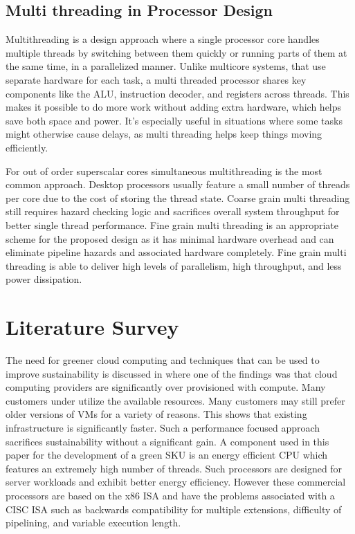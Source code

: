 \documentclass[conference]{IEEEtran}
\begin{document}
\subsection{Multi threading in Processor Design}

Multithreading is a design approach where a single processor core handles multiple threads by switching between them quickly or running parts of them at the same time, in a parallelized manner. Unlike multicore systems, that use separate hardware for each task, a multi threaded processor shares key components like the ALU, instruction decoder, and registers across threads. This makes it possible to do more work without adding extra hardware, which helps save both space and power. It’s especially useful in situations where some tasks might otherwise cause delays, as multi threading helps keep things moving efficiently.

For out of order superscalar cores simultaneous multithreading is the most common approach. Desktop processors usually feature a small number of threads per core due to the cost of storing the thread state. Coarse grain multi threading still requires hazard checking logic and sacrifices overall system throughput for better single thread performance. Fine grain multi threading is an appropriate scheme for the proposed design as it has minimal hardware overhead and can eliminate pipeline hazards and associated hardware completely. Fine grain multi threading is able to deliver high levels of parallelism, high throughput, and less power dissipation.

\section{Literature Survey}
\begin{flushleft}
The need for greener cloud computing and techniques that can be used to improve sustainability is discussed in \cite{GreenSKU} where one of the findings was that cloud computing providers are significantly over provisioned with compute. Many customers under utilize the available resources. Many customers may still prefer older versions of VMs for a variety of reasons. This shows that existing infrastructure is significantly faster. Such a performance focused approach sacrifices sustainability without a significant gain. A component used in this paper for the development of a green SKU is an energy efficient CPU which features an extremely high number of threads. Such processors are designed for server workloads and exhibit better energy efficiency. However these commercial processors are based on the x86 ISA and have the problems associated with a CISC ISA such as backwards compatibility for multiple extensions, difficulty of pipelining, and variable execution length.
\end{flushleft}
\end{document}

